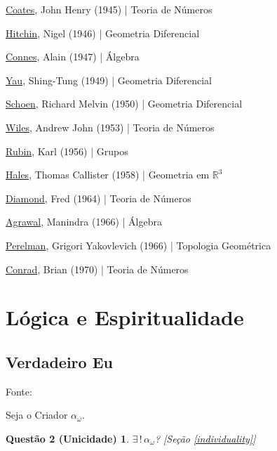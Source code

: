 \documentclass[12pt,a4paper]{article}
\begin{document}
			\href{http://en.wikipedia.org/wiki/John_Coates_(mathematician)}{Coates}, John Henry (1945) | Teoria de N\'umeros

			\href{http://en.wikipedia.org/wiki/Nigel_Hitchin}{Hitchin}, Nigel (1946) | Geometria Diferencial

			\href{http://en.wikipedia.org/wiki/Alain_Connes}{Connes}, Alain (1947) | \'Algebra

			\href{http://en.wikipedia.org/wiki/Shing-Tung_Yau}{Yau}, Shing-Tung (1949) | Geometria Diferencial

			\href{http://en.wikipedia.org/wiki/Richard_Schoen}{Schoen}, Richard Melvin (1950) | Geometria Diferencial

			\href{http://en.wikipedia.org/wiki/Andrew_Wiles}{Wiles}, Andrew John (1953) | Teoria de N\'umeros

			\href{http://en.wikipedia.org/wiki/Karl_Rubin}{Rubin}, Karl (1956) | Grupos

			\href{http://en.wikipedia.org/wiki/Thomas_Callister_Hales}{Hales}, Thomas Callister (1958) | Geometria em $ \mathbb{R}^3 $

			\href{http://en.wikipedia.org/wiki/Fred_Diamond}{Diamond}, Fred (1964) | Teoria de N\'umeros

			\href{http://en.wikipedia.org/wiki/Manindra_Agrawal}{Agrawal}, Manindra (1966) | \'Algebra

			\href{http://en.wikipedia.org/wiki/Grigori_Perelman}{Perelman}, Grigori Yakovlevich (1966) | Topologia Geom\'etrica

			\href{http://en.wikipedia.org/wiki/Brian_Conrad}{Conrad}, Brian (1970) | Teoria de N\'umeros

	\section{L\'ogica e Espiritualidade}
			\begin{flushright}
			\end{flushright}

		\subsection{Verdadeiro Eu}\label{verdadeiroEu}
			\begin{flushright}
			\end{flushright}

			Fonte: \cite{pastorino}

			Seja o Criador $ \alpha_\omega $.

			\newtheorem{Q2}{Quest\~ao 2 (Unicidade)}\label{unicidade}
			\begin{Q2} $ \exists \, ! \, \alpha_\omega $? [Se\c{c}\~ao \ref{individuality}]
			\end{Q2}
\end{document}
